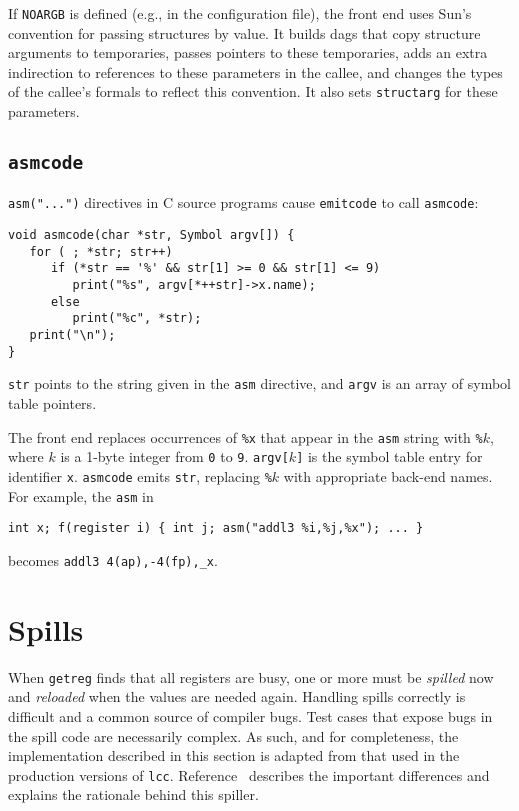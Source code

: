 If \verb|NOARGB| is defined (e.g., in the configuration file),
the front end uses Sun's convention for passing structures by value.
It builds dags that copy structure arguments to temporaries,
passes pointers to these temporaries, adds an extra indirection
to references to these parameters in the callee, and changes
the types of the callee's formals to reflect this convention.
It also sets \verb|structarg| for these parameters.

\subsection{\tt asmcode}

\label{asmcode}
\verb|asm("...")| directives in C source programs cause
\verb|emitcode| to call \verb|asmcode|:
\begin{verbatim}
void asmcode(char *str, Symbol argv[]) {
   for ( ; *str; str++)
      if (*str == '%' && str[1] >= 0 && str[1] <= 9)
         print("%s", argv[*++str]->x.name);
      else
         print("%c", *str);
   print("\n");
}
\end{verbatim}
\verb|str| points to the string given in the \verb|asm| directive,
and \verb|argv| is an array of symbol table pointers.

The front end replaces occurrences of \verb|%x|
that appear in the \verb|asm| string
with \verb|%|$k$, where $k$ is a 1-byte integer from \verb|0| to \verb|9|.
\verb|argv[|$k$\verb|]| is the symbol table entry for identifier \verb|x|.
\verb|asmcode| emits \verb|str|, replacing \verb|%|$k$ with appropriate
back-end names.
For example, the \verb|asm| in
\begin{verbatim}
int x; f(register i) { int j; asm("addl3 %i,%j,%x"); ... }
\end{verbatim}
becomes \verb|addl3 4(ap),-4(fp),_x|.

\section{Spills}

\label{spills}
When \verb|getreg| finds that all registers are busy,
one or more must be {\em spilled} now and {\em reloaded}
when the values are needed again.
Handling spills correctly is difficult and a common
source of compiler bugs. Test cases that expose
bugs in the spill code are necessarily complex.
As such, and for completeness,
the implementation described in this section is adapted
from that used in the production versions of \verb|lcc|.
Reference~\cite{fraser:hanson:92} describes the important
differences and explains the rationale behind this spiller.


